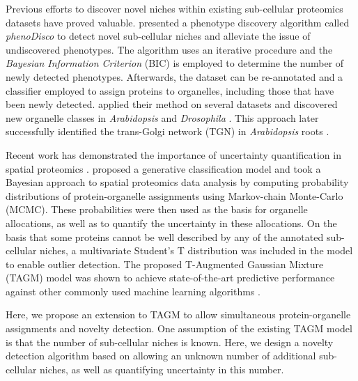 \documentclass[12pt,english]{article}
\begin{document}
Previous efforts to discover novel niches within existing sub-cellular proteomics datasets have proved valuable. \cite{Breckels:2013} presented a phenotype discovery algorithm called \textit{phenoDisco} to detect novel sub-cellular niches and alleviate the issue of undiscovered phenotypes. The algorithm uses an iterative procedure and the \textit{Bayesian Information Criterion} (BIC) \citep{Schwarz::1978} is employed to determine the number of newly detected phenotypes. Afterwards, the dataset can be re-annotated and a classifier employed to assign proteins to organelles, including those that have been newly detected. \cite{Breckels:2013} applied their method on several datasets and discovered new organelle classes in \textit{Arabidopsis} \citep{Dunkley:2006} and \textit{Drosophila} \citep{Tan:2009}. This approach later successfully identified the trans-Golgi network (TGN) in \textit{Arabidopsis} roots \citep{Groen:2014}.

Recent work has demonstrated the importance of uncertainty quantification in spatial proteomics \citep{Crook:2018,Crook::2019b, Crook::2019a}. \cite{Crook:2018} proposed a generative classification model and took a Bayesian approach to spatial proteomics data analysis by computing probability distributions of protein-organelle assignments using Markov-chain Monte-Carlo (MCMC). These probabilities were then used as the basis for organelle allocations, as well as to quantify the uncertainty in these allocations. On the basis that some proteins cannot be well described by any of the annotated sub-cellular niches, a multivariate Student's T distribution was included in the model to enable outlier detection. The proposed T-Augmented Gaussian Mixture (TAGM) model was shown to achieve state-of-the-art predictive performance against other commonly used machine learning algorithms \citep{Crook:2018}. 

Here, we propose an extension to TAGM to allow simultaneous protein-organelle assignments and novelty detection. One assumption of the existing TAGM model is that the number of sub-cellular niches is known. Here, we design a novelty detection algorithm based on allowing an unknown number of additional sub-cellular niches, as well as quantifying uncertainty in this number.
\end{document}
